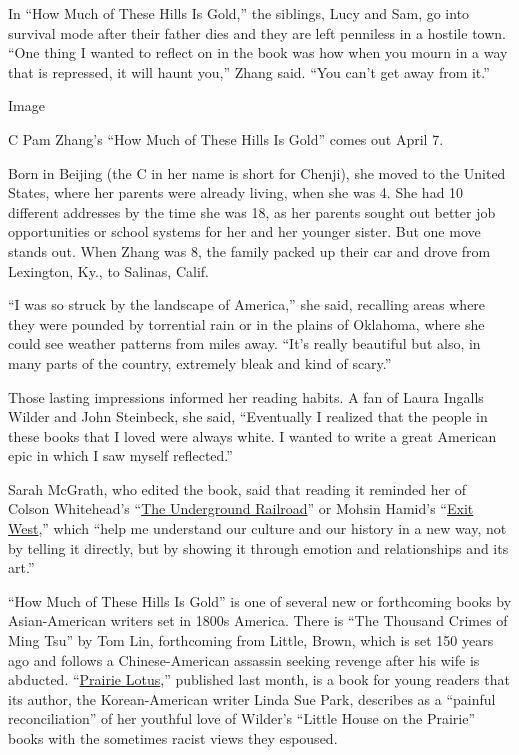 In ``How Much of These Hills Is Gold,'' the siblings, Lucy and Sam, go
into survival mode after their father dies and they are left penniless
in a hostile town. ``One thing I wanted to reflect on in the book was
how when you mourn in a way that is repressed, it will haunt you,''
Zhang said. ``You can't get away from it.''

Image

C Pam Zhang's ``How Much of These Hills Is Gold'' comes out April 7.

Born in Beijing (the C in her name is short for Chenji), she moved to
the United States, where her parents were already living, when she was
4. She had 10 different addresses by the time she was 18, as her parents
sought out better job opportunities or school systems for her and her
younger sister. But one move stands out. When Zhang was 8, the family
packed up their car and drove from Lexington, Ky., to Salinas, Calif.

``I was so struck by the landscape of America,'' she said, recalling
areas where they were pounded by torrential rain or in the plains of
Oklahoma, where she could see weather patterns from miles away. ``It's
really beautiful but also, in many parts of the country, extremely bleak
and kind of scary.''

Those lasting impressions informed her reading habits. A fan of Laura
Ingalls Wilder and John Steinbeck, she said, ``Eventually I realized
that the people in these books that I loved were always white. I wanted
to write a great American epic in which I saw myself reflected.''

Sarah McGrath, who edited the book, said that reading it reminded her of
Colson Whitehead's
``\href{https://www.nytimes.com/2016/08/03/books/review-the-underground-railroad-colson-whitehead.html}{The
Underground Railroad}'' or Mohsin Hamid's
``\href{https://www.nytimes.com/2017/03/10/books/review/exit-west-mohsin-hamid.html}{Exit
West},'' which ``help me understand our culture and our history in a new
way, not by telling it directly, but by showing it through emotion and
relationships and its art.''

``How Much of These Hills Is Gold'' is one of several new or forthcoming
books by Asian-American writers set in 1800s America. There is ``The
Thousand Crimes of Ming Tsu'' by Tom Lin, forthcoming from Little,
Brown, which is set 150 years ago and follows a Chinese-American
assassin seeking revenge after his wife is abducted.
``\href{https://www.nytimes.com/2020/03/06/books/review/prairie-lotus-linda-sue-park.html}{Prairie
Lotus},'' published last month, is a book for young readers that its
author, the Korean-American writer Linda Sue Park, describes as a
``painful reconciliation'' of her youthful love of Wilder's ``Little
House on the Prairie'' books with the sometimes racist views they
espoused.

